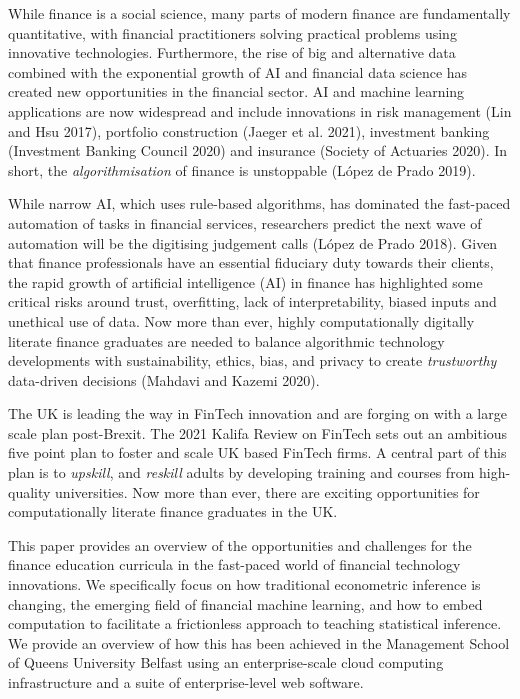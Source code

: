 \documentclass{article}
\begin{document}
While finance is a social science, many parts of modern finance are
fundamentally quantitative, with financial practitioners solving
practical problems using innovative technologies. Furthermore, the rise
of big and alternative data combined with the exponential growth of AI
and financial data science has created new opportunities in the
financial sector. AI and machine learning applications are now
widespread and include innovations in risk management (Lin and Hsu
2017), portfolio construction (Jaeger et al. 2021), investment banking
(Investment Banking Council 2020) and insurance (Society of Actuaries
2020). In short, the \emph{algorithmisation} of finance is unstoppable
(López de Prado 2019).

While narrow AI, which uses rule-based algorithms, has dominated the
fast-paced automation of tasks in financial services, researchers
predict the next wave of automation will be the digitising judgement
calls (López de Prado 2018). Given that finance professionals have an
essential fiduciary duty towards their clients, the rapid growth of
artificial intelligence (AI) in finance has highlighted some critical
risks around trust, overfitting, lack of interpretability, biased inputs
and unethical use of data. Now more than ever, highly computationally
digitally literate finance graduates are needed to balance algorithmic
technology developments with sustainability, ethics, bias, and privacy
to create \emph{trustworthy} data-driven decisions (Mahdavi and Kazemi
2020).

The UK is leading the way in FinTech innovation and are forging on with
a large scale plan post-Brexit. The 2021 Kalifa Review on FinTech sets
out an ambitious five point plan to foster and scale UK based FinTech
firms. A central part of this plan is to \emph{upskill}, and
\emph{reskill} adults by developing training and courses from
high-quality universities. Now more than ever, there are exciting
opportunities for computationally literate finance graduates in the UK.

This paper provides an overview of the opportunities and challenges for
the finance education curricula in the fast-paced world of financial
technology innovations. We specifically focus on how traditional
econometric inference is changing, the emerging field of financial
machine learning, and how to embed computation to facilitate a
frictionless approach to teaching statistical inference. We provide an
overview of how this has been achieved in the Management School of
Queens University Belfast using an enterprise-scale cloud computing
infrastructure and a suite of enterprise-level web software.
\end{document}
